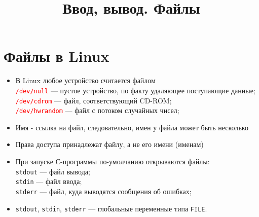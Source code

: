 \documentclass {article}
\date{}
\title{{\bfseries Ввод, вывод. Файлы}}
\begin{document}
\maketitle
\section{Файлы в Linux}
\begin{itemize}
\item В Linux любое устройство считается файлом\\
\texttt{\textcolor{red}{/dev/null}} --- пустое устройство, по факту удаляющее поступающие данные;\\
\texttt{\textcolor{red}{/dev/cdrom}} --- файл, соответствующий CD-ROM;\\
\texttt{\textcolor{red}{/dev/hwrandom}} --- файл с потоком случайных чисел;
\item Имя - ссылка на файл, следовательно, имен у файла может быть несколько
\item Права доступа принадлежат файлу, а не его имени (именам)
\item При запуске С-программы по-умолчанию открываются файлы:\\
 \texttt{stdout} --- файл вывода;\\
 \texttt{stdin} --- файл ввода;\\
 \texttt{stderr} --- файл, куда выводятся сообщения об ошибках;
\item \texttt{stdout}, \texttt{stdin}, \texttt{stderr} --- глобальные переменные типа \texttt{FILE}.
\end{itemize}
\end{document}
